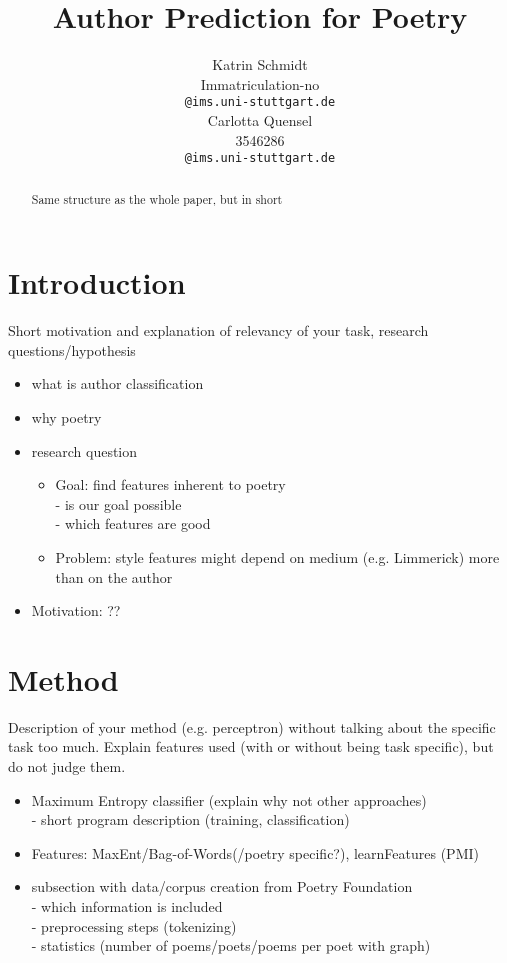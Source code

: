 \documentclass[11pt]{article}
\title{Author Prediction for Poetry}
\author{Katrin Schmidt \\
   Immatriculation-no\\
  \texttt{@ims.uni-stuttgart.de} \\\And
  Carlotta Quensel \\
  3546286 \\
  \texttt{@ims.uni-stuttgart.de} \\}
\begin{document}
\maketitle
\begin{abstract}
Same structure as the whole paper, but in short
\end{abstract}

\section{Introduction}
Short motivation and explanation of relevancy
of your task, research questions/hypothesis
\begin{itemize}
\item what is author classification
\item why poetry
\item research question
\begin{itemize}
\item Goal: find features inherent to poetry\\- is our goal possible\\- which features are good
\item Problem: style features might depend on medium (e.g. Limmerick) more than on the author
\end{itemize}
\item Motivation: ??
\end{itemize}


\section{Method}

Description of your method (e.g. perceptron) without talking about the specific task too much. Explain features used (with or without being task specific), but do not judge them.
\begin{itemize}
\item Maximum Entropy classifier (explain why not other approaches)\\
      - short program description (training, classification)
\item Features: MaxEnt/Bag-of-Words(/poetry specific?), learnFeatures (PMI)
\item subsection with data/corpus creation from Poetry Foundation\\
      - which information is included\\
      - preprocessing steps (tokenizing)\\
      - statistics (number of poems/poets/poems per poet with graph)
\end{itemize}
\end{document}
